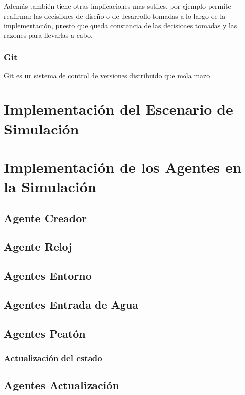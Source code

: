 Además también tiene otras implicaciones mas sutiles, por ejemplo permite
reafirmar las decisiones de diseño o de desarrollo tomadas a lo largo de la
implementación, puesto que queda constancia de las decisiones tomadas y las
razones para llevarlas a cabo.
\subsubsection*{Git}

Git es un sistema de control de versiones distribuido que mola mazo %

\section*{Implementación del Escenario de Simulación}
\section*{Implementación de los Agentes en la Simulación}
\subsection*{Agente Creador}
\subsection*{Agente Reloj}
\subsection*{Agentes Entorno}
\subsection*{Agentes Entrada de Agua}
\subsection*{Agentes Peatón}
\subsubsection*{Actualización del estado}
\subsection*{Agentes Actualización}
